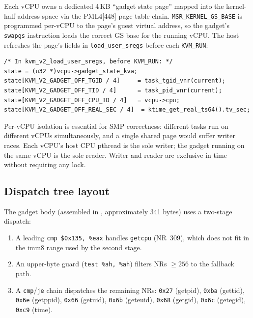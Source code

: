 Each vCPU owns a dedicated 4\,KB ``gadget state page'' mapped into the
kernel-half address space via the PML4[448] page table chain.
\texttt{MSR\_KERNEL\_GS\_BASE} is programmed per-vCPU to the page's guest
virtual address, so the gadget's \texttt{swapgs} instruction loads the
correct GS base for the running vCPU.  The host refreshes the page's fields
in \texttt{load\_user\_sregs} before each \texttt{KVM\_RUN}:

\begin{lstlisting}[language=KernelC,
    caption={Per-vCPU gadget state page refresh (simplified)},
    label={lst:gadget-refresh}]
/* In kvm_v2_load_user_sregs, before KVM_RUN: */
state = (u32 *)vcpu->gadget_state_kva;
state[KVM_V2_GADGET_OFF_TGID / 4]     = task_tgid_vnr(current);
state[KVM_V2_GADGET_OFF_TID / 4]      = task_pid_vnr(current);
state[KVM_V2_GADGET_OFF_CPU_ID / 4]   = vcpu->cpu;
state[KVM_V2_GADGET_OFF_REAL_SEC / 4]  = ktime_get_real_ts64().tv_sec;
\end{lstlisting}

Per-vCPU isolation is essential for SMP correctness: different tasks run
on different vCPUs simultaneously, and a single shared page would suffer
writer races.  Each vCPU's host CPU pthread is the sole writer; the gadget
running on the same vCPU is the sole reader.  Writer and reader are
exclusive in time without requiring any lock.

\subsection{Dispatch tree layout}

The gadget body (assembled in ,
approximately 341 bytes) uses a two-stage dispatch:

\begin{enumerate}[leftmargin=2em]
  \item A leading \texttt{cmp \$0x135, \%eax} handles \texttt{getcpu}
    (NR~309), which does not fit in the imm8 range used by the second stage.
  \item An upper-byte guard (\texttt{test \%ah, \%ah}) filters NRs $\geq 256$
    to the fallback path.
  \item A \texttt{cmp}/\texttt{je} chain dispatches the remaining NRs:
    \texttt{0x27} (getpid), \texttt{0xba} (gettid), \texttt{0x6e} (getppid),
    \texttt{0x66} (getuid), \texttt{0x6b} (geteuid), \texttt{0x68} (getgid),
    \texttt{0x6c} (getegid), \texttt{0xc9} (time).
\end{enumerate}

